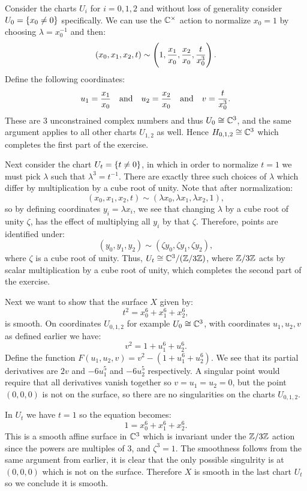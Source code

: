 \documentclass[11pt, a4paper]{article}
\begin{document}
\begin{solution}
  Consider the charts $U_i$ for $i=0,1,2$ and without loss of generality
  consider $U_0 = \left\{x_0 \neq 0\right\}$ specifically.
  We can use the $\mathbb{C}^{\times}$ action to normalize $x_0 = 1$
  by choosing $\lambda = x_0^{-1}$ and then:
  \[
    (x_0,x_1,x_2,t) \sim 
    \del{1, \frac{x_1}{x_0}, \frac{x_2}{x_0}, \frac{t}{x_0^3}}.
  \]
  Define the following coordinates:
  \[
    u_1 = \frac{x_1}{x_0} \quad \text{and} \quad
    u_2 = \frac{x_2}{x_0} \quad \text{and} \quad
    v = \frac{t}{x_0^3}.
  \]
  These are $3$ unconstrained complex numbers and thus $U_0 \cong \mathbb{C}^3$,
  and the same argument applies to all other charts $U_{1,2}$ as well.
  Hence $H_{0,1,2} \cong \mathbb{C}^3$ which completes the first part of the exercise. 

  Next consider the chart $U_t = \left\{t \neq 0\right\}$, in which in order to
  normalize $t = 1$ we must pick $\lambda$ such that $\lambda^3 = t^{-1}$.
  There are exactly three such choices of $\lambda$ which differ by 
  multiplication by a cube root of unity. 
  Note that after normalization:
  \[
    (x_0,x_1,x_2,t) \sim (\lambda x_0, \lambda x_1, \lambda x_2, 1),
  \]
  so by defining coordinates $y_i = \lambda x_i$, we see that changing
  $\lambda$ by a cube root of unity $\zeta$, has the effect of multiplying
  all $y_i$ by that $\zeta$. 
  Therefore, points are identified under:
  \[
    (y_0,y_1,y_2) \sim (\zeta y_0, \zeta y_1, \zeta y_2),
  \]
  where $\zeta$ is a cube root of unity. 
  Thus, $U_t \cong \mathbb{C}^3 / (\mathbb{Z}/3\mathbb{Z})$,
  where $\mathbb{Z}/3\mathbb{Z}$ acts by scalar multiplication by a cube root of unity,
  which completes the second part of the exercise.

  Next we want to show that the surface $X$ given by:
  \[
    t^2 = x_0^6 + x_1^6 + x_2^6,
  \]
  is smooth. 
  On coordinates $U_{0,1,2}$ for example $U_0 \cong \mathbb{C}^3$,
  with coordinates $u_1,u_2,v$ as defined earlier we have:
  \[
    v^2 = 1 + u_1^6 + u_2^6.
  \]
  Define the function $F(u_1,u_2,v) = v^2 - (1 + u_1^6 + u_2^6)$. 
  We see that its partial derivatives are $2v$ and $-6u_1^5$ and $-6u_2^5$
  respectively. 
  A singular point would require that all derivatives vanish together
  so $v = u_1 = u_2 = 0$, but the point $(0,0,0)$ is not on the surface,
  so there are no singularities on the charts $U_{0,1,2}$. 

  In $U_t$ we have $t = 1$ so the equation becomes:
  \[
    1 = x_0^6 + x_1^6 + x_2^6.
  \]
  This is a smooth affine surface in $\mathbb{C}^3$ which is invariant under the 
  $\mathbb{Z}/3\mathbb{Z}$ action since the powers are multiples of $3$, and $\zeta^3 = 1$. 
  The smoothness follows from the same argument from earlier,
  it is clear that the only possible singulrity is at $(0,0,0)$ which is 
  not on the surface. Therefore $X$ is smooth in the last chart $U_t$ 
  so we conclude it is smooth. 


\end{solution}
\end{document}
